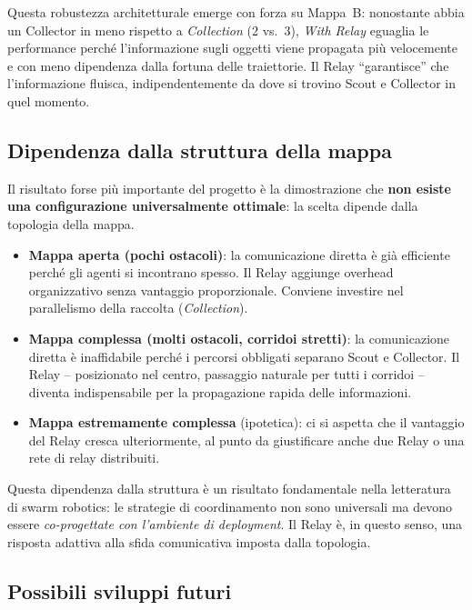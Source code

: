 Questa robustezza architetturale emerge con forza su Mappa~B: nonostante abbia un Collector in meno rispetto a \emph{Collection} (2 vs.\ 3), \emph{With Relay} eguaglia le performance perché l'informazione sugli oggetti viene propagata più velocemente e con meno dipendenza dalla fortuna delle traiettorie. Il Relay ``garantisce'' che l'informazione fluisca, indipendentemente da dove si trovino Scout e Collector in quel momento.

\subsection{Dipendenza dalla struttura della mappa}

Il risultato forse più importante del progetto è la dimostrazione che \textbf{non esiste una configurazione universalmente ottimale}: la scelta dipende dalla topologia della mappa.

\begin{itemize}
  \item \textbf{Mappa aperta (pochi ostacoli)}: la comunicazione diretta è già efficiente perché gli agenti si incontrano spesso. Il Relay aggiunge overhead organizzativo senza vantaggio proporzionale. Conviene investire nel parallelismo della raccolta (\emph{Collection}).
  
  \item \textbf{Mappa complessa (molti ostacoli, corridoi stretti)}: la comunicazione diretta è inaffidabile perché i percorsi obbligati separano Scout e Collector. Il Relay -- posizionato nel centro, passaggio naturale per tutti i corridoi -- diventa indispensabile per la propagazione rapida delle informazioni.
  
  \item \textbf{Mappa estremamente complessa} (ipotetica): ci si aspetta che il vantaggio del Relay cresca ulteriormente, al punto da giustificare anche due Relay o una rete di relay distribuiti.
\end{itemize}

Questa dipendenza dalla struttura è un risultato fondamentale nella letteratura di swarm robotics: le strategie di coordinamento non sono universali ma devono essere \emph{co-progettate con l'ambiente di deployment}. Il Relay è, in questo senso, una risposta adattiva alla sfida comunicativa imposta dalla topologia.

\subsection{Possibili sviluppi futuri}

